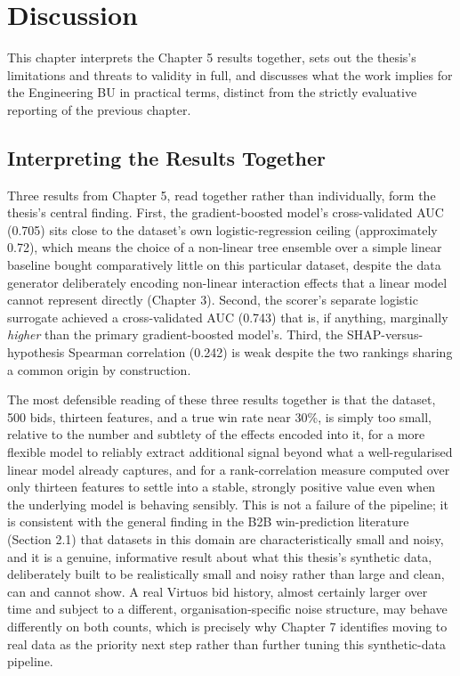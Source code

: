 \hypertarget{discussion}{%
\chapter{Discussion}\label{discussion}}

This chapter interprets the Chapter 5 results together, sets out the
thesis's limitations and threats to validity in full, and discusses what
the work implies for the Engineering BU in practical terms, distinct
from the strictly evaluative reporting of the previous chapter.

\hypertarget{interpreting-the-results-together}{%
\section{Interpreting the Results
Together}\label{interpreting-the-results-together}}

Three results from Chapter 5, read together rather than individually,
form the thesis's central finding. First, the gradient-boosted model's
cross-validated AUC (0.705) sits close to the dataset's own
logistic-regression ceiling (approximately 0.72), which means the choice
of a non-linear tree ensemble over a simple linear baseline bought
comparatively little on this particular dataset, despite the data
generator deliberately encoding non-linear interaction effects that a
linear model cannot represent directly (Chapter 3). Second, the scorer's
separate logistic surrogate achieved a cross-validated AUC (0.743) that
is, if anything, marginally \emph{higher} than the primary
gradient-boosted model's. Third, the SHAP-versus-hypothesis Spearman
correlation (0.242) is weak despite the two rankings sharing a common
origin by construction.

The most defensible reading of these three results together is that the
dataset, 500 bids, thirteen features, and a true win rate near 30\%, is
simply too small, relative to the number and subtlety of the effects
encoded into it, for a more flexible model to reliably extract
additional signal beyond what a well-regularised linear model already
captures, and for a rank-correlation measure computed over only thirteen
features to settle into a stable, strongly positive value even when the
underlying model is behaving sensibly. This is not a failure of the
pipeline; it is consistent with the general finding in the B2B
win-prediction literature (Section 2.1) that datasets in this domain are
characteristically small and noisy, and it is a genuine, informative
result about what this thesis's synthetic data, deliberately built to be
realistically small and noisy rather than large and clean, can and
cannot show. A real Virtuos bid history, almost certainly larger over
time and subject to a different, organisation-specific noise structure,
may behave differently on both counts, which is precisely why Chapter 7
identifies moving to real data as the priority next step rather than
further tuning this synthetic-data pipeline.

